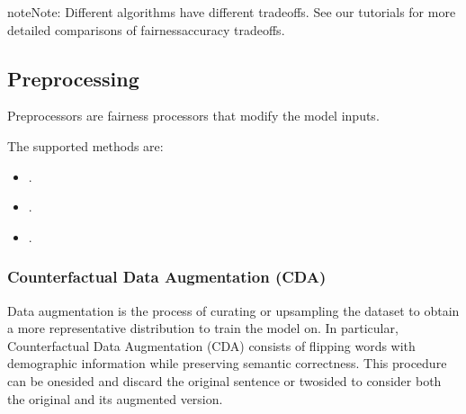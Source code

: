 \documentclass[letterpaper,10pt,english]{sphinxmanual}
\begin{document}
\begin{sphinxadmonition}{note}{Note:}
\sphinxAtStartPar
Different algorithms have different trade\sphinxhyphen{}offs. See our tutorials for more
detailed comparisons of fairness\sphinxhyphen{}accuracy tradeoffs.
\end{sphinxadmonition}

\sphinxstepscope


\subsection{Pre\sphinxhyphen{}processing}
\label{\detokenize{algorithms_preprocessors:pre-processing}}\label{\detokenize{algorithms_preprocessors::doc}}
\sphinxAtStartPar
Pre\sphinxhyphen{}processors are fairness processors that modify the model inputs.

\sphinxAtStartPar
The supported methods are:
\begin{itemize}
\item {} 
\sphinxAtStartPar
{\hyperref[\detokenize{algorithms_preprocessors:cda}]{}} .

\item {} 
\sphinxAtStartPar
{\hyperref[\detokenize{algorithms_preprocessors:emb}]{}} .

\item {} 
\sphinxAtStartPar
{\hyperref[\detokenize{algorithms_preprocessors:blind}]{}} .

\end{itemize}


\subsubsection{Counterfactual Data Augmentation (CDA)}
\label{\detokenize{algorithms_preprocessors:counterfactual-data-augmentation-cda}}\label{\detokenize{algorithms_preprocessors:cda}}
\sphinxAtStartPar
Data augmentation is the process of curating or upsampling the dataset to obtain a more representative distribution to train the model on.
In particular, Counterfactual Data Augmentation (CDA)  consists of flipping words with demographic information
while preserving semantic correctness. This procedure can be one\sphinxhyphen{}sided and discard the original sentence or two\sphinxhyphen{}sided to consider both the original and its
augmented version.
\end{document}
